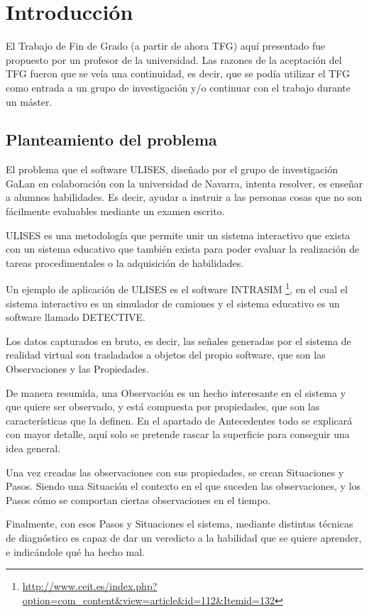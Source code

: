 \chapter{Introducci\'{o}n} 
El Trabajo de Fin de Grado (a partir de ahora TFG) aqu\'{i} presentado fue propuesto por un profesor de la universidad.
Las razones de la aceptaci\'{o}n del TFG fueron que se ve\'{i}a una continuidad, es decir, que se pod\'{i}a 
utilizar el TFG como entrada a un grupo de investigaci\'{o}n y/o continuar con el trabajo durante un m\'{a}ster.

\section{Planteamiento del problema}
El problema que el software ULISES, dise\~nado por el grupo de investigaci\'on GaLan en colaboraci\'on
con la universidad de Navarra, intenta resolver, es ense\~nar a alumnos habilidades. Es decir, ayudar a 
instruir a las personas cosas que no son f\'acilmente evaluables mediante un examen escrito.

ULISES es una metodolog\'ia que permite unir un sistema interactivo que exista
con un sistema educativo que tambi\'en exista para poder evaluar la realizaci\'on de tareas procedimentales 
o la adquisici\'on de habilidades.

Un ejemplo de aplicaci\'on de ULISES es el software INTRASIM 
\footnote{\url{http://www.ceit.es/index.php?option=com_content&view=article&id=112&Itemid=132}}, 
en el cual el sistema interactivo es un simulador de camiones y el sistema educativo es un software
llamado DETECTIVE.

Los datos capturados en bruto, es decir, las se\~nales generadas por el sistema de 
realidad virtual son trasladados a objetos del propio software,
que son las Observaciones y las Propiedades.

De manera resumida, una Observaci\'on es un hecho interesante en el sistema y que quiere ser observado, y 
est\'a compuesta por propiedades, que son las caracter\'isticas que la definen. En el 
apartado de Antecedentes todo se explicar\'a con mayor detalle, aqu\'i solo se pretende rascar la superficie para 
conseguir una idea general.

Una vez creadas las observaciones con sus propiedades, se crean Situaciones y Pasos. Siendo una Situaci\'on el contexto
en el que suceden las observaciones, y los Pasos c\'omo se comportan ciertas observaciones en el tiempo.

Finalmente, con esos Pasos y Situaciones el sistema, mediante distintas t\'ecnicas de diagn\'ostico 
es capaz de dar un veredicto
a la habilidad que se quiere aprender, e indic\'andole qu\'e ha hecho mal.

